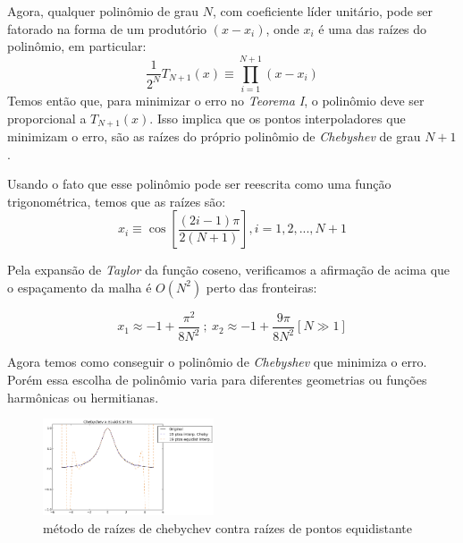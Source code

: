  Agora, qualquer polinômio de grau $N$, com coeficiente líder unitário, pode ser fatorado na forma de um produtório  $(x - x_i)$, onde $x_i$ é uma das raízes do polinômio, em particular: 
 \begin{equation}
 \frac{1}{2^N}T_{N+1}(x) \equiv \prod_{i = 1}^{N+1} (x-x_i)
 \end{equation}
 Temos então que, para minimizar o erro no \emph{Teorema I}, o polinômio deve ser proporcional a $T_{N+1}(x)$. Isso implica que  os pontos interpoladores que minimizam o erro, são as raízes do próprio polinômio de \emph{Chebyshev} de grau $N+1$.
 
 Usando o fato que esse polinômio pode ser reescrita como uma função trigonométrica, temos que as raízes são:
 \begin{equation}
  x_i  \equiv \cos \left [ \frac{(2i - 1)\pi}{2(N+1)}  \right ] , i = 1,2,..., N+1
 \end{equation}
 
 Pela expansão de \emph{Taylor} da função coseno, verificamos a afirmação de acima que o espaçamento da malha é $O(N^2)$ perto das fronteiras:
 
 \begin{equation}
  x_1 \approx -1 + \frac{\pi^2}{8N^2}\ ;\ x_2 \approx -1 + \frac{9\pi}{8N^2} [N\gg 1]
 \end{equation}
 
 Agora temos como conseguir o polinômio de \emph{Chebyshev} que minimiza o erro. Porém essa escolha de polinômio varia para diferentes geometrias ou funções harmônicas ou hermitianas.
 \begin{figure}[b]
 \includegraphics[width=0.45\textwidth, center]{figuras/chebychev_equidist.png}
 \caption{método de raízes de chebychev contra raízes de pontos equidistante}
 \end{figure}
\pagebreak

